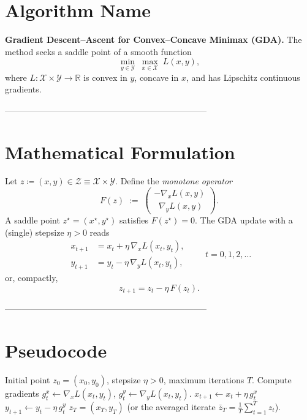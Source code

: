 \documentclass{article}
\begin{document}
\section*{Algorithm Name}
\textbf{Gradient Descent–Ascent for Convex–Concave Minimax
(GDA).}  
The method seeks a saddle point of a smooth function  
\[
\min_{y\in\mathcal Y}\;\max_{x\in\mathcal X}\;L(x,y),
\]
where $L:\mathcal X\times\mathcal Y\to\mathbb R$ is convex in $y$,
concave in $x$, and has Lipschitz continuous gradients.

-----------------------------------------------------------------------

\section*{Mathematical Formulation}
Let $z\coloneqq (x,y)\in\mathcal Z\equiv\mathcal X\times\mathcal Y$.
Define the \emph{monotone operator}
\[
F(z)\;:=\;
\begin{pmatrix}
-\nabla_x L(x,y)\\[2mm]
\;\;\nabla_y L(x,y)
\end{pmatrix}.
\tag{1}
\]
A saddle point $z^{\star}=(x^{\star},y^{\star})$ satisfies $F(z^{\star})=0$.
The GDA update with a (single) stepsize $\eta>0$ reads
\[
\boxed{
\begin{aligned}
x_{t+1}&=x_t+\eta\,\nabla_x L(x_t,y_t),\\[1mm]
y_{t+1}&=y_t-\eta\,\nabla_y L(x_t,y_t),
\end{aligned}}
\qquad t=0,1,2,\dots
\tag{2}
\]
or, compactly,
\[
z_{t+1}=z_t-\eta\,F(z_t).                                          \tag{3}
\]

-----------------------------------------------------------------------

\section*{Pseudocode}
\begin{algorithm}[H]
\caption{Gradient Descent–Ascent (GDA)}
\begin{algorithmic}[1]
\Require Initial point $z_0=(x_0,y_0)$, stepsize $\eta>0$, 
maximum iterations $T$.
    \State Compute gradients $g^x_t\gets\nabla_x L(x_t,y_t)$,
          $g^y_t\gets\nabla_y L(x_t,y_t)$.
    \State $x_{t+1}\gets x_t+\eta\,g^x_t$ 
    \State $y_{t+1}\gets y_t-\eta\,g^y_t$ 
\EndFor
\State \Return $z_T=(x_T,y_T)$ (or the averaged iterate
      $\bar z_T=\tfrac1T\sum_{t=1}^T z_t$).
\end{algorithmic}
\end{algorithm}
\end{document}
